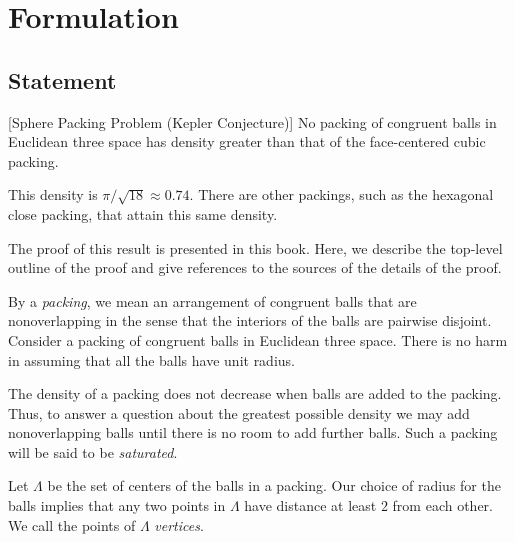 



\chapter{Formulation}

\section{Statement}



\begin{theorem}[Sphere Packing Problem (Kepler Conjecture)]
\label{theorem:kepler}   No packing of congruent balls in
Euclidean three space has density greater than that of the
face-centered cubic packing.
\end{theorem}

\begin{remark}
This density is $\pi/\sqrt{18}\approx 0.74.$  There are other
packings, such as the hexagonal close packing, that attain this
same density.
\end{remark}

The proof of this result is presented in this book. Here, we
describe the top-level outline of the proof and give references to
the sources of the details of the proof.

By a {\it packing}, we mean an arrangement of congruent balls that
are nonoverlapping in the sense that the interiors of the balls are
pairwise disjoint. Consider a 
 packing of congruent
balls in Euclidean three space. There is no harm in assuming that
all the balls have unit radius. 

The density of a packing does not
decrease when balls are added to the packing. Thus, to answer a
question about the greatest possible density we may add
nonoverlapping balls until there is no room to add further balls.
Such a packing will be said to be {\it saturated}.


Let $\Lambda$ be the set of centers of the balls in a
packing. Our choice of radius for the
balls implies that any two points in $\Lambda$ have distance at
least $2$ from each other. We call the points of $\Lambda$ {\it
{} vertices}.


